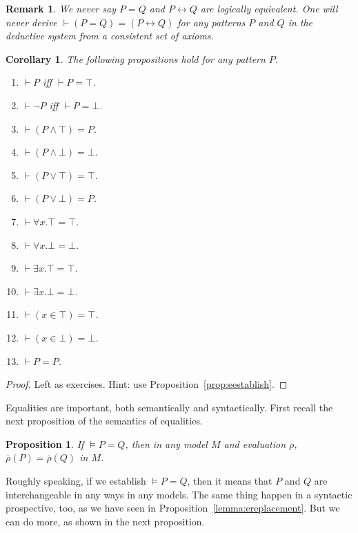 \documentclass{article}
\theoremstyle{plain}
\newtheorem{prop}[thm]{Proposition}
\newtheorem{cor}[thm]{Corollary}
\newtheorem{rmk}[thm]{Remark}
\begin{document}
\begin{rmk}
We never say $P=Q$ and $P \leftrightarrow Q$ are logically equivalent. One will never derive $\vdash (P = Q) = (P \leftrightarrow Q)$ for any patterns $P$ and $Q$ in the deductive system from a consistent set of axioms.
\end{rmk}

\begin{cor}
\label{cor:topbot_simp}
	The following propositions hold for any pattern $P$.
	\begin{enumerate}
		\item $\vdash P$ iff $\vdash P = \top$.
		\item $\vdash \neg P$ iff $\vdash P = \bot$.
		\item $\vdash \left(P \wedge \top\right) = P$.
		\item $\vdash (P \wedge \bot) = \bot$.
		\item $\vdash (P \vee \top) = \top$.
		\item $\vdash (P \vee \bot) = P$.
		\item $\vdash \forall x . \top = \top$.
		\item $\vdash \forall x . \bot = \bot$.
		\item $\vdash \exists x . \top = \top$.
		\item $\vdash \exists x . \bot = \bot$.
		\item $\vdash (x \in \top) = \top$.
		\item $\vdash (x \in \bot) = \bot$.
		\item $\vdash P = P$.
	\end{enumerate}
\end{cor}
\begin{proof}
	Left as exercises. Hint: use Proposition~\ref{prop:eestablish}.
\end{proof}

Equalities are important, both semantically and syntactically. First recall the next proposition of the semantics of equalities.

\begin{prop}
	If $\models P = Q$, then in any model $M$ and evaluation $\rho$, $\bar{\rho}(P) = \bar{\rho}(Q)$ in $M$.
\end{prop}

Roughly speaking, if we establish $\models P = Q$, then it means that $P$ and $Q$ are interchangeable in any ways in any models. The same thing happen in a syntactic prospective, too, as we have seen in Proposition~\ref{lemma:ereplacement}. But we can do more, as shown in the next proposition.
\end{document}
